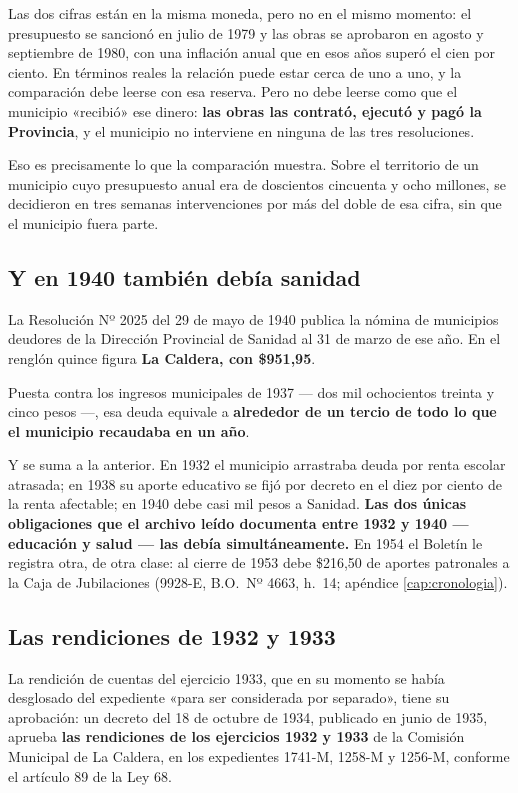 \begin{cautela}
Las dos cifras están en la misma moneda, pero no en el mismo momento: el presupuesto se sancionó en julio de 1979 y las obras se aprobaron en agosto y septiembre de 1980, con una inflación anual que en esos años superó el cien por ciento. En términos reales la relación puede estar cerca de uno a uno, y la comparación debe leerse con esa reserva. Pero no debe leerse como que el municipio «recibió» ese dinero: \textbf{las obras
las contrató, ejecutó y pagó la Provincia}, y el municipio no interviene en ninguna de las
tres resoluciones.

Eso es precisamente lo que la comparación muestra. Sobre el territorio de un municipio cuyo
presupuesto anual era de doscientos cincuenta y ocho millones, se decidieron en tres semanas
intervenciones por más del doble de esa cifra, sin que el municipio fuera parte.
\end{cautela}

\subsection*{Y en 1940 también debía sanidad}

La Resolución Nº 2025 del 29 de mayo de 1940 publica la nómina de municipios deudores de la
Dirección Provincial de Sanidad al 31 de marzo de ese año. En el renglón quince figura
\textbf{La Caldera, con \$951,95}.

Puesta contra los ingresos municipales de 1937 --- dos mil ochocientos treinta y
cinco pesos ---, esa deuda equivale a \textbf{alrededor de un tercio de todo lo que el
municipio recaudaba en un año}.

Y se suma a la anterior. En 1932 el municipio arrastraba deuda por renta escolar atrasada; en
1938 su aporte educativo se fijó por decreto en el diez por ciento de la renta afectable; en
1940 debe casi mil pesos a Sanidad. \textbf{Las dos únicas obligaciones que el archivo leído
documenta entre 1932 y 1940 --- educación y salud --- las debía simultáneamente.} En 1954 el Boletín le registra otra, de otra clase: al cierre de 1953 debe \$216,50 de aportes patronales a la Caja de Jubilaciones (9928-E, B.O.\ Nº 4663, h.\ 14; apéndice \ref{cap:cronologia}).

\subsection*{Las rendiciones de 1932 y 1933}

La rendición de cuentas del ejercicio 1933, que en su
momento se había desglosado del expediente «para ser considerada por separado», tiene su
aprobación: un decreto del 18 de octubre de 1934, publicado en junio de 1935, aprueba
\textbf{las rendiciones de los ejercicios 1932 y 1933} de la Comisión Municipal de La
Caldera, en los expedientes 1741-M, 1258-M y 1256-M, conforme el artículo 89 de la Ley 68.

